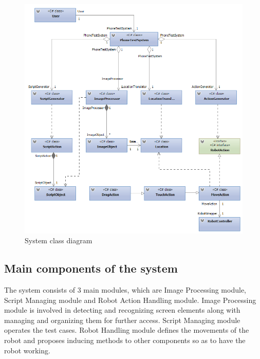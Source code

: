     \begin{figure}[H]
		\centering
		\includegraphics[scale=0.75]{Chapters/Fig/class_diagram.png}
		\caption{System class diagram}
		\label{fig:class_diagram}
	\end{figure}

\subsection{Main components of the system}
The system consists of 3 main modules, which are Image Processing module, Script Managing module and Robot Action Handling module. Image Processing module is involved in detecting and recognizing screen elements along with managing and organizing them for further access. Script Managing module operates the test cases. Robot Handling module defines the movements of the robot and proposes inducing methods to other components so as to have the robot working.

